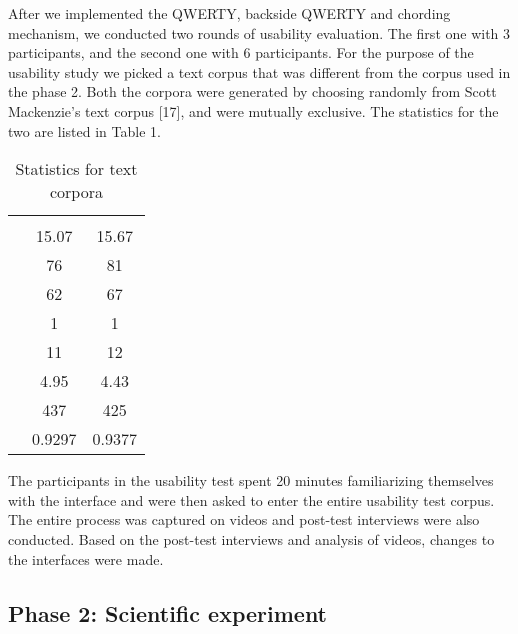 After we implemented the QWERTY, backside QWERTY and chording
mechanism, we conducted two rounds of usability evaluation. The first
one with 3 participants, and the second one with 6 participants. For
the purpose of the usability study we picked a text corpus that was
different from the corpus used in the phase 2. Both the corpora were
generated by choosing randomly from Scott Mackenzie's text corpus
[17], and were mutually exclusive. The statistics for the two
are listed in Table 1.

\begin{table}
	\centering
		\begin{tabular}{rcc}
		                         & \begin{minipage}{2cm} \centering \color{grey}{Experiment corpus}\end{minipage} & \begin{minipage}{2cm} \centering \color{grey}{Usability test corpus}\end{minipage}  \\ 
			 \color{grey}{Average phrase length} & 15.07 & 15.67 \\ 
			 \color{grey}{Number of words} & 76 & 81 \\ 
			 \color{grey}{Unique words} & 62 & 67 \\ 
			 \color{grey}{Min. length of word} & 1 & 1 \\ 
			 \color{grey}{Max. length of word} & 11 & 12 \\ 
			 \color{grey}{Average word length} & 4.95 & 4.43 \\ 
			 \color{grey}{Number of characters} & 437 & 425 \\ 
			 \color{grey}{Correlation with English} & 0.9297 & 0.9377 \\ 
		\end{tabular}
	\caption{Statistics for text corpora}
	\label{tab:StatisticsForTextCorpora}
\end{table}

The participants in the usability test spent 20 minutes familiarizing
themselves with the interface and were then asked to enter the entire
usability test corpus. The entire process was captured on videos and
post-test interviews were also conducted. Based on the post-test
interviews and analysis of videos, changes to the interfaces were
made.

\subsection{Phase 2: Scientific experiment}
